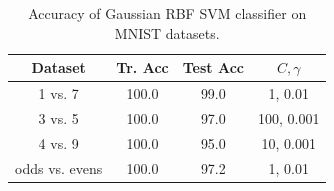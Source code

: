 \begin{table}[ht!]
\centering
\begin{tabular}{||c c c c||}  
 \hline
 Dataset & Tr. Acc & Test Acc & $C, \gamma$ \\ [0.3ex] 
 \hline\hline
 1 vs. 7 & 100.0 & 99.0 & 1, 0.01 \\ 
 \hline
 3 vs. 5 & 100.0 & 97.0 & 100, 0.001 \\ 
 \hline
 4 vs. 9 & 100.0 & 95.0 & 10, 0.001 \\ 
 \hline
 odds vs. evens & 100.0 & 97.2 & 1, 0.01 \\ 
 \hline
\end{tabular}
\caption{Accuracy of Gaussian RBF SVM classifier on MNIST datasets.}
\label{table_4_2}
\end{table}

